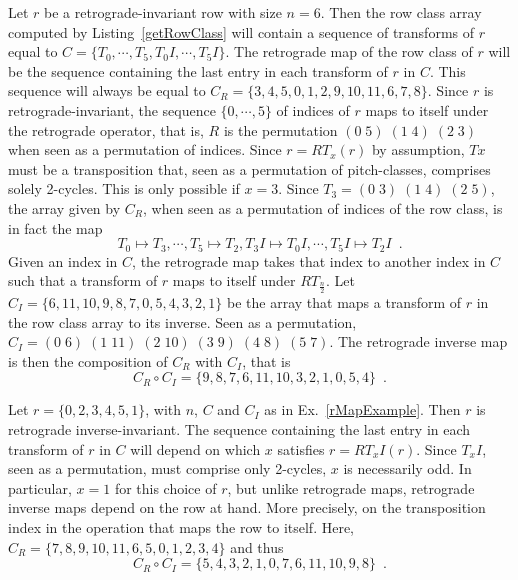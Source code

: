 \begin{example}
\label{rMapExample}
Let $r$ be a retrograde-invariant row with size $n = 6$. Then the row class array computed by Listing~\ref{getRowClass} will contain a sequence of transforms of $r$ equal to $C = \{T_0, \cdots, T_5, T_0I, \cdots, T_5I\}$. The retrograde map of the row class of $r$ will be the sequence containing the last entry in each transform of $r$ in $C$. This sequence will always be equal to $C_R = \{3, 4, 5, 0, 1, 2, 9, 10, 11, 6, 7, 8\}$. Since $r$ is retrograde-invariant, the sequence $\{0, \cdots, 5\}$ of indices of $r$ maps to itself under the retrograde operator, that is, $R$ is the permutation $(0 \; 5) \; (1 \; 4) \; (2 \; 3)$ when seen as a permutation of indices. Since $r = RT_x(r)$ by assumption, $Tx$ must be a transposition that, seen as a permutation of pitch-classes, comprises solely 2-cycles. This is only possible if $x = 3$. Since $T_3 = (0 \; 3) \; (1 \; 4) \; (2 \; 5)$, the array given by $C_R$, when seen as a permutation of indices of the row class, is in fact the map
\begin{equation}
	T_0 \mapsto T_3, \cdots, T_5 \mapsto T_2, T_3I \mapsto T_0I, \cdots, T_5I \mapsto T_2I \enspace.
\end{equation}
Given an index in $C$, the retrograde map takes that index to another index in $C$ such that a transform of $r$ maps to itself under $RT_\frac{n}{2}$. Let $C_I = \{6, 11, 10, 9, 8, 7, 0, 5, 4, 3, 2, 1\}$ be the array that maps a transform of $r$ in the row class array to its inverse. Seen as a permutation, $C_I = (0 \; 6) \; (1 \; 11) \; (2 \; 10) \; (3 \; 9) \; (4 \; 8) \; (5 \; 7)$. The retrograde inverse map is then the composition of $C_R$ with $C_I$, that is
\begin{equation}
	C_R \circ C_I = \{9, 8, 7, 6, 11, 10, 3, 2, 1, 0, 5, 4\} \enspace.
\end{equation}
\end{example}

\begin{example}
Let $r = \{0, 2, 3, 4, 5, 1\}$, with $n$, $C$ and $C_I$ as in Ex.~\ref{rMapExample}. Then $r$ is retrograde inverse-invariant. The sequence containing the last entry in each transform of $r$ in $C$ will depend on which $x$ satisfies $r = RT_xI(r)$. Since $T_xI$, seen as a permutation, must comprise only 2-cycles, $x$ is necessarily odd. In particular, $x = 1$ for this choice of $r$, but unlike retrograde maps, retrograde inverse maps depend on the row at hand. More precisely, on the transposition index in the operation that maps the row to itself. Here, $C_R = \{7, 8, 9, 10, 11, 6, 5, 0, 1, 2, 3, 4\}$ and thus
\begin{equation}
	C_R \circ C_I = \{5, 4, 3, 2, 1, 0, 7, 6, 11, 10, 9, 8\} \enspace.
\end{equation}
\end{example}

